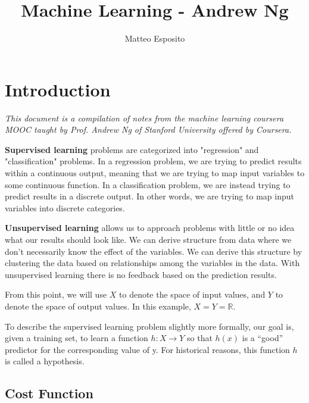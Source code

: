 \documentclass{article}
\title{Machine Learning -  Andrew Ng}
\author{Matteo Esposito}
\begin{document}
    \begin{titlingpage}
        \maketitle
    \end{titlingpage}
    \newpage

    \section{Introduction}

        \textit{This document is a compilation of notes from the machine learning coursera MOOC taught by Prof. Andrew Ng of Stanford University
        offered by Coursera.}
        \par
        \textbf{Supervised learning} problems are categorized into "regression" and "classification" problems. In a regression problem, 
        we are trying to predict results within a continuous output, meaning that we are trying to map input variables to some 
        continuous function. In a classification problem, we are instead trying to predict results in a discrete output. In other words, 
        we are trying to map input variables into discrete categories.
        \par
        \textbf{Unsupervised learning} allows us to approach problems with little or no idea what our results should look like. 
        We can derive structure from data where we don't necessarily know the effect of the variables.
        We can derive this structure by clustering the data based on relationships among the variables in the data.
        With unsupervised learning there is no feedback based on the prediction results.
        \par
        From this point, we will use $X$ to denote the space of input values, and $Y$ to denote the space of output values. In this example, $X = Y = \mathbb{R}$.
        \par
        To describe the supervised learning problem slightly more formally, our goal is, given a training set, 
        to learn a function $h : X \longrightarrow Y$ so that $h(x)$ is a “good” predictor for the corresponding value of y. For historical reasons, this 
        function $h$ is called a hypothesis. 
        
        \subsection{Cost Function}
            
\end{document}
